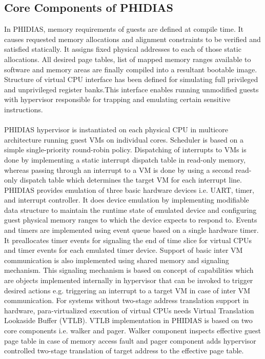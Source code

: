 \subsection{Core Components of PHIDIAS}
In PHIDIAS, memory requirements of guests are defined at compile time. It causes requested memory allocations and alignment constraints to be verified and satisfied statically. It assigns fixed physical addresses to each of those static allocations. All desired page tables, list of mapped memory ranges available to software and memory areas are finally compiled into a resultant bootable image. Structure of virtual CPU interface has been defined for simulating full privileged and unprivileged register banks.This interface enables running unmodified guests with hypervisor responsible for trapping and emulating certain sensitive instructions. 
\\
\\
PHIDIAS hypervisor is instantiated on each physical CPU in multicore architecture running guest VMs on individual cores. Scheduler is based on a simple single-priority round-robin policy. Dispatching of interrupts to VMs is done by implementing a static interrupt dispatch table in read-only memory, whereas passing through an interrupt to a VM is done by using a second read-only dispatch table which determines the target VM for each interrupt line. PHIDIAS provides emulation of three basic hardware devices i.e. UART, timer, and interrupt controller. It does device emulation by implementing modifiable data structure to maintain the runtime state of emulated device and configuring guest physical memory ranges to which the device expects to respond to. Events and timers are implemented using event queue based on a single hardware timer. It preallocates timer events for signaling the end of time slice for virtual CPUs and timer events for each emulated timer device. Support of basic inter VM communication is also implemented using shared memory and signaling mechanism. This signaling mechanism is based on concept of capabilities which are objects implemented internally in hypervisor that can be invoked to trigger desired actions e.g. triggering an interrupt to a target VM in case of inter VM communication. For systems without two-stage address translation support in hardware, para-virtualized execution of virtual CPUs needs Virtual Translation Lookaside Buffer (VTLB). VTLB implementation in PHIDIAS is based on two core components i.e. walker and pager. Walker component inspects effective guest page table in case of memory access fault and pager component adds hypervisor controlled two-stage translation of target address to the effective page table.

